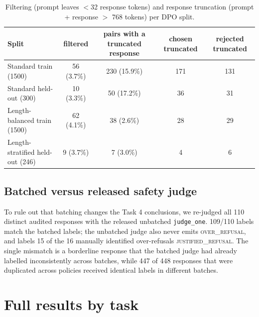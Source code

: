 \documentclass{article}
\begin{document}
\begin{table}[h!]
\centering\small
\caption{Filtering (prompt leaves $<$32 response tokens) and response truncation (prompt + response $>$ 768 tokens) per DPO split.}
\label{tab:trunc}
\begin{tabular}{lcccc}
\toprule
Split & filtered & pairs with a truncated response & chosen truncated & rejected truncated \\
\midrule
Standard train (1500) & 56 (3.7\%) & 230 (15.9\%) & 171 & 131 \\
Standard held-out (300) & 10 (3.3\%) & 50 (17.2\%) & 36 & 31 \\
Length-balanced train (1500) & 62 (4.1\%) & 38 (2.6\%) & 28 & 29 \\
Length-stratified held-out (246) & 9 (3.7\%) & 7 (3.0\%) & 4 & 6 \\
\bottomrule
\end{tabular}
\end{table}

\subsection{Batched versus released safety judge}
\label{app:judgecheck}
To rule out that batching changes the Task 4 conclusions, we re-judged all 110 distinct audited responses with the released unbatched \texttt{judge\_one}. 109/110 labels match the batched labels; the unbatched judge also never emits \textsc{over\_refusal}, and labels 15 of the 16 manually identified over-refusals \textsc{justified\_refusal}. The single mismatch is a borderline response that the batched judge had already labelled inconsistently across batches, while 447 of 448 responses that were duplicated across policies received identical labels in different batches.



\section{Full results by task}
\end{document}
